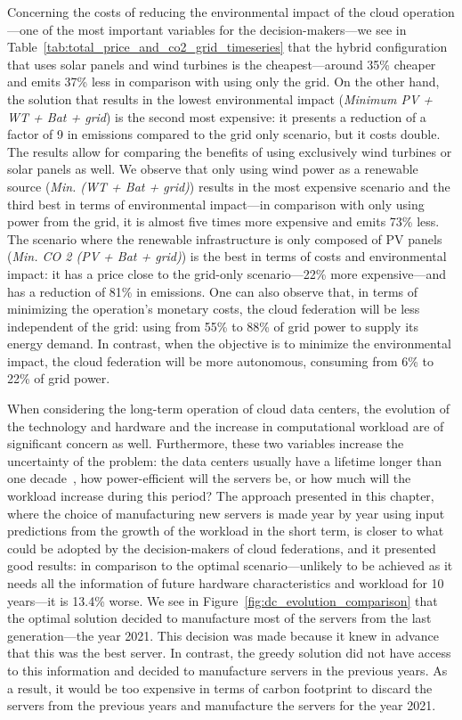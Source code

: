 Concerning the costs of reducing the environmental impact of the cloud operation---one of the most important variables for the decision-makers---we see in Table~\ref {tab:total_price_and_co2_grid_timeseries} that the hybrid configuration that uses solar panels and wind turbines is the cheapest---around 35\% cheaper and emits 37\% less  in comparison with using only the grid. On the other hand, the solution that results in the lowest environmental impact (\textit{Minimum  PV + WT + Bat + grid}) is the second most expensive: it presents a reduction of a factor of 9 in  emissions compared to the grid only scenario, but it costs double. The results allow for comparing the benefits of using exclusively wind turbines or solar panels as well. We observe that only using wind power as a renewable source (\textit{Min.  (WT + Bat + grid)}) results in the most expensive scenario and the third best in terms of environmental impact---in comparison with only using power from the grid, it is almost five times more expensive and emits 73\% less. The scenario where the renewable infrastructure is only composed of PV panels (\textit{Min. CO 2 (PV + Bat + grid)}) is the best in terms of costs and environmental impact: it has a price close to the grid-only scenario---22\% more expensive---and has a reduction of 81\% in  emissions. One can also observe that, in terms of minimizing the operation's monetary costs, the cloud federation will be less independent of the grid: using from 55\% to 88\% of grid power to supply its energy demand. In contrast, when the objective is to minimize the environmental impact, the cloud federation will be more autonomous, consuming from 6\% to 22\% of grid power.

When considering the long-term operation of cloud data centers, the evolution of the technology and hardware and the increase in computational workload are of significant concern as well. Furthermore, these two variables increase the uncertainty of the problem: the data centers usually have a lifetime longer than one decade~\cite{datacenter_as_computer}, how power-efficient will the servers be, or how much will the workload increase during this period? The approach presented in this chapter, where the choice of manufacturing new servers is made year by year using input predictions from the growth of the workload in the short term, is closer to what could be adopted by the decision-makers of cloud federations, and it presented good results: in comparison to the optimal scenario---unlikely to be achieved as it needs all the information of future hardware characteristics and workload for 10 years---it is 13.4\% worse. We see in Figure~\ref{fig:dc_evolution_comparison} that the optimal solution decided to manufacture most of the servers from the last generation---the year 2021. This decision was made because it knew in advance that this was the best server. In contrast, the greedy solution did not have access to this information and decided to manufacture servers in the previous years. As a result, it would be too expensive in terms of carbon footprint to discard the servers from the previous years and manufacture the servers for the year 2021.

